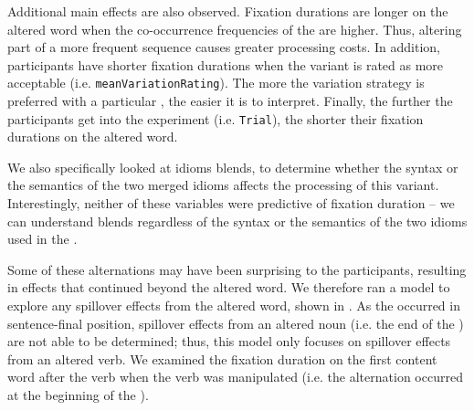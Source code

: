 \documentclass[output=paper
,modfonts
,nonflat]{langsci/langscibook}
\begin{document}
Additional main effects are also observed. Fixation durations are longer on the altered word when the co-occurrence frequencies of the  are higher. Thus, altering part of a more frequent sequence causes greater processing costs. In addition, participants have shorter fixation durations when the variant is rated as more acceptable (i.e. \texttt{meanVariationRating}). The more the variation strategy  is preferred with a particular , the easier it is to interpret. Finally, the further the participants get into the experiment (i.e. \texttt{Trial}), the shorter their fixation durations on the altered word. 

We also specifically looked at idioms blends,  to determine whether the syntax or the semantics of the two merged idioms affects the processing of this variant. Interestingly, neither of these variables were predictive of fixation duration -- we can understand   blends regardless of the syntax or the semantics of the two idioms used in the .




Some of these alternations may have been surprising to the participants, resulting in effects that continued beyond the altered word. We therefore ran a model to explore any spillover effects from the altered word, shown in . As the   occurred in sentence-final position, spillover effects from an altered noun (i.e. the end of the ) are not able to be determined; thus, this model only focuses on spillover effects from an altered verb. We examined the fixation duration on the first content word after the verb when the verb was manipulated (i.e. the alternation occurred at the beginning of the ).  
\end{document}
